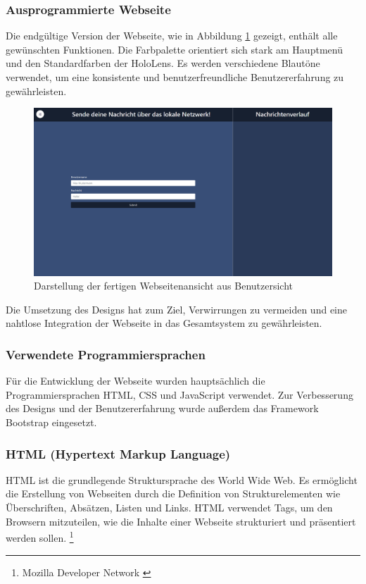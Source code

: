 \subsubsection*{Ausprogrammierte Webseite}
Die endgültige Version der Webseite, wie in Abbildung \ref{fig:frontend} gezeigt, enthält alle gewünschten Funktionen.
Die Farbpalette orientiert sich stark am Hauptmenü und den Standardfarben der HoloLens. Es werden verschiedene Blautöne
verwendet, um eine konsistente und benutzerfreundliche Benutzererfahrung zu gewährleisten.

\begin{figure}[H]
    \centering
    \includegraphics[width=1\textwidth]{images/frontend.png}
    \caption{Darstellung der fertigen Webseitenansicht aus Benutzersicht}
    \label{fig:frontend}
\end{figure}

Die Umsetzung des Designs hat zum Ziel, Verwirrungen zu vermeiden und eine nahtlose Integration der Webseite in das
Gesamtsystem zu gewährleisten.

\subsubsection{Verwendete Programmiersprachen}
Für die Entwicklung der Webseite wurden hauptsächlich die Programmiersprachen HTML, CSS und JavaScript verwendet. Zur
Verbesserung des Designs und der Benutzererfahrung wurde außerdem das Framework Bootstrap eingesetzt.

\subsubsection*{HTML (Hypertext Markup Language)}
HTML ist die grundlegende Struktursprache des World Wide Web. Es ermöglicht die Erstellung von Webseiten durch die
Definition von Strukturelementen wie Überschriften, Absätzen, Listen und Links. HTML verwendet Tags, um den Browsern
mitzuteilen, wie die Inhalte einer Webseite strukturiert und präsentiert werden sollen. \footnote{Mozilla Developer Network \cite{HTML}}


